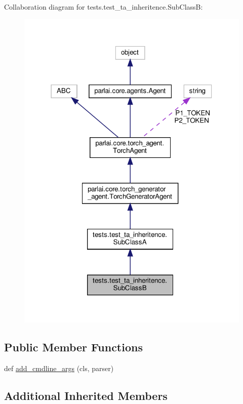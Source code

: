 Collaboration diagram for tests.\+test\+\_\+ta\+\_\+inheritence.\+Sub\+ClassB\+:
\nopagebreak
\begin{figure}[H]
\begin{center}
\leavevmode
\includegraphics[width=318pt]{classtests_1_1test__ta__inheritence_1_1SubClassB__coll__graph}
\end{center}
\end{figure}
\subsection*{Public Member Functions}
\begin{DoxyCompactItemize}
\item 
def \hyperlink{classtests_1_1test__ta__inheritence_1_1SubClassB_a9aa7384116305903fbf530d4710e83a3}{add\+\_\+cmdline\+\_\+args} (cls, parser)
\end{DoxyCompactItemize}
\subsection*{Additional Inherited Members}



